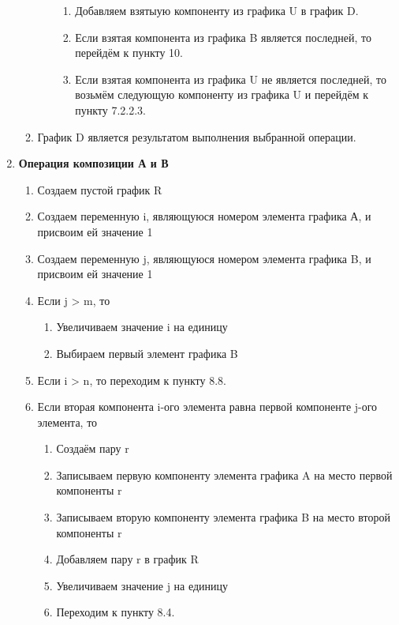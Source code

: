 \documentclass[a4paper,12pt]{extarticle}
\begin{document}
\begin{enumerate}
\begin{enumerate}[label*=\arabic*.]
\begin{enumerate}[label*=\arabic*.]
\begin{enumerate}[label*=\arabic*.]
          \item Добавляем взятыую компоненту из графика U в график D.
          \item Если взятая компонента из графика B является последней, то перейдём к пункту 10.
          \item Если взятая компонента из графика U не является последней, то возьмём следующую компоненту из графика U и перейдём к пункту 7.2.2.3.
        \end{enumerate}
      \end{enumerate}
    \item График D является результатом выполнения выбранной операции.
    \end{enumerate}
  \item \textbf{Операция композиции А и В}
    \begin{enumerate}[label*=\arabic*.]
    \item Создаем пустой график R
    \item Создаем переменную i, являющуюся номером элемента графика А, и присвоим ей значение 1
    \item Создаем переменную j, являющуюся номером элемента графика B, и присвоим ей значение 1
    \item Если j > m, то
        \begin{enumerate}[label*=\arabic*.]
            \item Увеличиваем значение i на единицу
            \item Выбираем первый элемент графика B
        \end{enumerate}
    \item Если i > n, то переходим к пункту 8.8.
    \item Если вторая компонента i-ого элемента равна первой компоненте j-ого элемента, то
        \begin{enumerate}[label*=\arabic*.]
            \item Создаём пару r
            \item Записываем первую компоненту элемента графика A на место первой компоненты r
            \item Записываем вторую компоненту элемента графика B на место второй компоненты r
            \item Добавляем пару r в график R
            \item Увеличиваем значение j на единицу
            \item Переходим к пункту 8.4.
        \end{enumerate}

\end{enumerate}
\end{enumerate}
\end{document}

